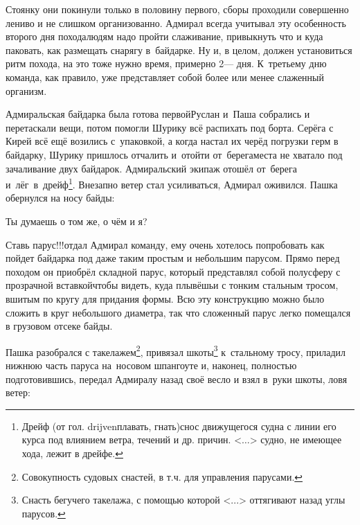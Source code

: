 Стоянку они покинули только в половину первого, сборы проходили совершенно лениво и не слишком организованно. Адмирал всегда учитывал эту особенность второго дня похода\mdash людям надо пройти слаживание, привыкнуть что и куда паковать, как размещать снарягу в~байдарке. Ну и, в целом, должен установиться ритм похода, на это тоже нужно время, примерно 2\thinspace\nobreakdash--- дня. К~третьему дню команда, как правило, уже представляет собой более или менее слаженный организм. 

\renewcommand*{\thefootnote}{\fnsymbol{footnote}}
\setcounter{footnote}{0}
Адмиральская байдарка была готова первой\mdash Руслан и~Паша собрались и перетаскали вещи, потом помогли Шурику всё распихать под борта. Серёга с Кирей всё ещё возились с~упаковкой, а когда настал их черёд погрузки герм в байдарку, Шурику пришлось отчалить и~отойти от~берега\mdash места не хватало под зачаливание двух байдарок. Адмиральский экипаж отошёл от~берега и~лёг~в~дрейф\footnote{Дрейф (от гол. drijven\mdash плавать, гнать)\mdash снос движущегося судна с линии его курса под влиянием ветра, течений и др. причин. <$\ldots$> судно, не имеющее хода, лежит в дрейфе.}. Внезапно ветер стал усиливаться, Адмирал оживился. Пашка обернулся на носу байды:

\diagdash Ты думаешь о том же, о чём и я?

\diagdash Ставь парус!!!\mdash отдал Адмирал команду, ему очень хотелось попробовать как пойдет байдарка под даже таким простым и небольшим парусом. Прямо перед походом он приобрёл складной парус, который представлял собой полусферу с прозрачной вставкой\mdash чтобы видеть, куда плывёшь\mdash и с тонким стальным тросом, вшитым по кругу для придания формы. Всю эту конструкцию можно было сложить в круг небольшого диаметра, так что сложенный парус легко помещался в грузовом отсеке байды.


\begingroup
\justifying
\parfillskip=0pt %

\renewcommand*{\thefootnote}{\arabic{footnote}}
\setcounter{footnote}{0}
Пашка разобрался с такелажем\footnote{Совокупность судовых снастей, в т.ч. для управления парусами.}, привязал шкоты\footnote{Снасть бегучего такелажа, с помощью которой <...> оттягивают назад углы парусов.} к~стальному тросу, приладил нижнюю часть паруса на~носовом шпангоуте и, наконец, полностью подготовившись, передал Адмиралу назад своё весло и взял в~руки шкоты, ловя ветер:

